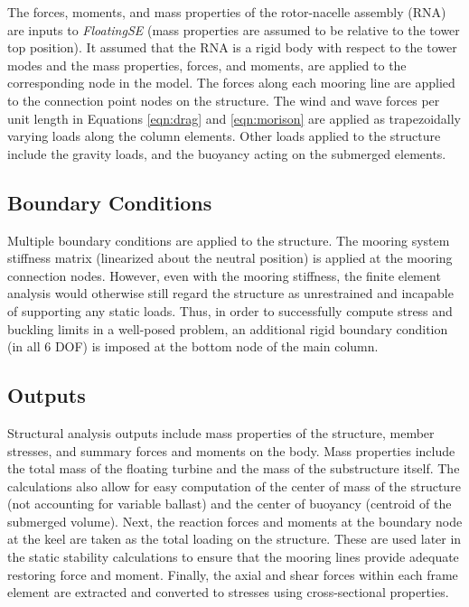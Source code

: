 The forces, moments, and mass properties of the rotor-nacelle assembly
(RNA) are inputs to \textit{FloatingSE} (mass properties are assumed to
be relative to the tower top position).  It assumed that the RNA is a
rigid body with respect to the tower modes and the mass properties,
forces, and moments, are applied to the corresponding node in the model.
The forces along each mooring line are applied to the connection
point nodes on the structure.  The wind and wave forces per unit length
in Equations \ref{eqn:drag} and \ref{eqn:morison} are applied as
trapezoidally varying loads along the column elements.  Other loads
applied to the structure include the gravity loads, and the buoyancy
acting on the submerged elements.

\subsection{Boundary Conditions}
Multiple boundary conditions are applied to the structure.  The mooring
system stiffness matrix (linearized about the neutral position) is
applied at the mooring connection nodes.  However, even with the mooring
stiffness, the finite element analysis would otherwise still regard the
structure as unrestrained and incapable of supporting any static loads.
Thus, in order to successfully compute stress and buckling limits in a
well-posed problem, an additional rigid boundary condition (in all 6
DOF) is imposed at the bottom node of the main column.

\subsection{Outputs}
Structural analysis outputs include mass properties of the structure,
member stresses, and summary forces and moments on the body.  Mass
properties include the total mass of the floating turbine and the mass
of the substructure itself.  The calculations also allow for easy
computation of the center of mass of the structure (not accounting for
variable ballast) and the center of buoyancy (centroid of the submerged
volume).  Next, the reaction forces and moments at the boundary node at
the keel are taken as the total loading on the structure.  These are
used later in the static stability calculations to ensure that the
mooring lines provide adequate restoring force and moment.  Finally, the
axial and shear forces within each frame element are extracted and
converted to stresses using cross-sectional properties.

